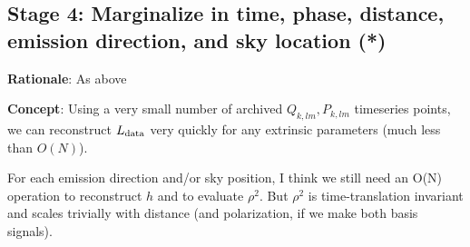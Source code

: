 \documentclass[twocolumn,prd,nofootinbib]{revtex4}
\begin{document}
\subsection{Stage 4: Marginalize in time, phase, distance,  emission direction, and sky location  (*)}

\noindent \textbf{Rationale}: As above

\noindent \textbf{Concept}:  Using a very small number of archived $Q_{k,lm},P_{k,lm}$ timeseries points, we can
reconstruct $L_{\rm data}$ very quickly for any extrinsic parameters (much less than $O(N)$).  

For each emission direction and/or sky position, I think we still need an O(N) operation to reconstruct $h$ and to
evaluate $\rho^2$.  But $\rho^2$ is time-translation invariant and scales trivially with distance (and polarization, if
we make both basis signals).
\end{document}
